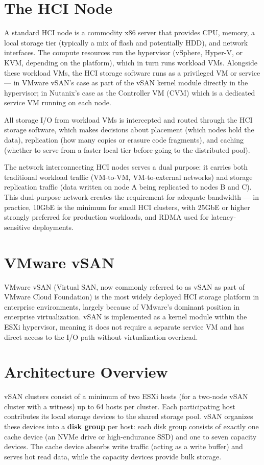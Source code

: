 \section{The HCI Node}
A standard HCI node is a commodity x86 server that provides CPU, memory, a local storage tier (typically a mix of flash and potentially HDD), and network interfaces. The compute resources run the hypervisor (vSphere, Hyper-V, or KVM, depending on the platform), which in turn runs workload VMs. Alongside these workload VMs, the HCI storage software runs as a privileged VM or service --- in VMware vSAN's case as part of the vSAN kernel module directly in the hypervisor; in Nutanix's case as the Controller VM (CVM) which is a dedicated service VM running on each node.

All storage I/O from workload VMs is intercepted and routed through the HCI storage software, which makes decisions about placement (which nodes hold the data), replication (how many copies or erasure code fragments), and caching (whether to serve from a faster local tier before going to the distributed pool).

The network interconnecting HCI nodes serves a dual purpose: it carries both traditional workload traffic (VM-to-VM, VM-to-external networks) and storage replication traffic (data written on node A being replicated to nodes B and C). This dual-purpose network creates the requirement for adequate bandwidth --- in practice, 10GbE is the minimum for small HCI clusters, with 25GbE or higher strongly preferred for production workloads, and RDMA used for latency-sensitive deployments.

\section{VMware vSAN}
VMware vSAN (Virtual SAN, now commonly referred to as vSAN as part of VMware Cloud Foundation) is the most widely deployed HCI storage platform in enterprise environments, largely because of VMware's dominant position in enterprise virtualization. vSAN is implemented as a kernel module within the ESXi hypervisor, meaning it does not require a separate service VM and has direct access to the I/O path without virtualization overhead.

\section{Architecture Overview}
vSAN clusters consist of a minimum of two ESXi hosts (for a two-node vSAN cluster with a witness) up to 64 hosts per cluster. Each participating host contributes its local storage devices to the shared storage pool. vSAN organizes these devices into a \textbf{disk group} per host: each disk group consists of exactly one cache device (an NVMe drive or high-endurance SSD) and one to seven capacity devices. The cache device absorbs write traffic (acting as a write buffer) and serves hot read data, while the capacity devices provide bulk storage.

